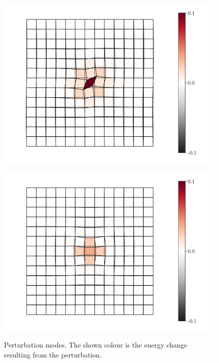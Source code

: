 \documentclass[fleqn]{goose-article}
\begin{document}
\begin{figure}[htp]
    \centering
    \captionsetup[subfigure]{justification=centering}
    \begin{minipage}[t]{.49\textwidth}
        \centering
        \includegraphics[width=\textwidth]{perturbation_simple-shear_energy.pdf}
        \label{fig:perturbation:simple-shear}
    \end{minipage}
    \hfill
    \begin{minipage}[t]{.49\textwidth}
        \centering
        \includegraphics[width=\textwidth]{perturbation_pure-shear_energy.pdf}
        \label{fig:perturbation:pure-shear}
    \end{minipage}
    \caption{
        Perturbation modes.
        The shown colour is the energy change resulting from the perturbation.
    }
    \label{fig:perturbation}
\end{figure}
\end{document}
